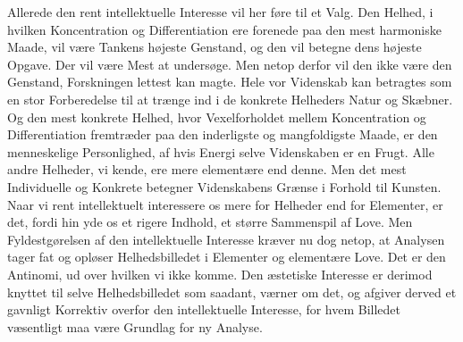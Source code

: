 \documentclass[12pt,a4paper]{book}
\newcommand{\apage}[1]{\marginnote{\footnotesize\textit{[#1]}}}
\begin{document}
Allerede den rent intellektuelle Interesse vil her føre til et Valg. Den Helhed, i hvilken
Koncentration og Differentiation ere forenede paa den mest harmoniske Maade, vil være
Tankens højeste Genstand, og den vil betegne dens højeste Opgave. Der vil være Mest at
undersøge. Men netop derfor vil den ikke være den Genstand, Forskningen lettest kan magte.
Hele vor Videnskab kan betragtes som en stor Forberedelse til at trænge ind i de konkrete
Helheders Natur og Skæbner. Og den mest konkrete Helhed, hvor Vexelforholdet mellem
Koncentration og Differentiation fremtræder paa den inderligste og mangfoldigste Maade, er
den menneskelige Personlighed, af hvis Energi selve Videnskaben er en Frugt. Alle andre
Helheder, vi kende, ere mere elementære end denne. Men det mest Individuelle og Konkrete
betegner Videnskabens Grænse i Forhold til Kunsten. Naar vi rent intellektuelt interessere
os mere for Helheder end for Elementer, er det, fordi hin yde os et rigere Indhold, et
større Sammenspil af Love. Men Fyldestgørelsen af den intellektuelle Interesse kræver nu
dog netop, at Analysen tager fat og opløser Helhedsbilledet i Elementer og elementære Love.
Det er den Antinomi, ud over hvilken vi ikke komme. Den æstetiske Interesse er derimod
knyttet til selve Helhedsbilledet som saadant, værner om det, og afgiver derved et gavnligt
Korrektiv overfor den intellektuelle Interesse, \apage{342} for hvem Billedet væsentligt maa være
Grundlag for ny Analyse.
\end{document}
